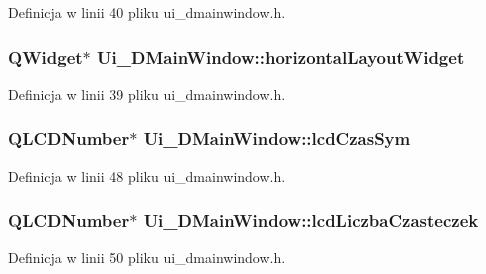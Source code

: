 Definicja w linii 40 pliku ui\+\_\+dmainwindow.\+h.

\hypertarget{class_ui___d_main_window_a777a56f3b74aa5b5cd5ff2c62a2968a9}{}
\subsubsection[{horizontal\+Layout\+Widget}]{\setlength{\rightskip}{0pt plus 5cm}Q\+Widget$\ast$ Ui\+\_\+\+D\+Main\+Window\+::horizontal\+Layout\+Widget}\label{class_ui___d_main_window_a777a56f3b74aa5b5cd5ff2c62a2968a9}


Definicja w linii 39 pliku ui\+\_\+dmainwindow.\+h.

\hypertarget{class_ui___d_main_window_af49335a21dc17e53674f8b62a640ca2d}{}
\subsubsection[{lcd\+Czas\+Sym}]{\setlength{\rightskip}{0pt plus 5cm}Q\+L\+C\+D\+Number$\ast$ Ui\+\_\+\+D\+Main\+Window\+::lcd\+Czas\+Sym}\label{class_ui___d_main_window_af49335a21dc17e53674f8b62a640ca2d}


Definicja w linii 48 pliku ui\+\_\+dmainwindow.\+h.

\hypertarget{class_ui___d_main_window_a3d6afe29d882b3a9119b68d79c9b5e0f}{}
\subsubsection[{lcd\+Liczba\+Czasteczek}]{\setlength{\rightskip}{0pt plus 5cm}Q\+L\+C\+D\+Number$\ast$ Ui\+\_\+\+D\+Main\+Window\+::lcd\+Liczba\+Czasteczek}\label{class_ui___d_main_window_a3d6afe29d882b3a9119b68d79c9b5e0f}


Definicja w linii 50 pliku ui\+\_\+dmainwindow.\+h.

\hypertarget{class_ui___d_main_window_a4eb8e2a87080f4f314eb96c52a82e39d}{}
